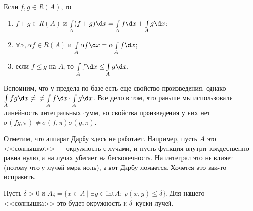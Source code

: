 \begin{Consequence}
Если $f, g \in R(A)$, то
\begin{enumerate}
\item $f + g \in R(A)$ и $\int\limits_A(f + g)\d x = \int\limits_A f \d x + \int\limits_Ag \d x$;
\item $\forall \alpha, \alpha f \in R(A)$ и $\int\limits_A\alpha f \d x = \alpha \int\limits_A f \d x$;
\item если $f \leq g$ на $A$, то $\int\limits_A f \d x \leq \int\limits_A g \d x$.
\end{enumerate}
\end{Consequence}

Вспомним, что у предела по базе есть еще свойство произведения, однако $\int\limits_A fg \d x \neq\\\neq \int\limits_A f\d x \cdot \int\limits_A g \d x$. Все дело в том, что раньше мы использовали линейность интегральных сумм, но свойства произведения у них нет: $\sigma(fg, \pi) \neq \sigma(f, \pi)\sigma(g, \pi)$.

Отметим, что аппарат Дарбу здесь не работает. Например, пусть $A$ это <<солнышко>> --- окружность с лучами, и пусть функция внутри тождественно равна нулю, а на лучах убегает на бесконечность. На интеграл это не влияет (потому что у лучей мера ноль), а вот Дарбу ломается. Хочется это как-то исправить.

Пусть $\delta > 0$ и $A_\delta = \{ x \in A \mid \exists y \in \mathrm{int}A:\ \rho(x, y) \leq \delta \}$. Для нашего <<солнышка>> это будет окружность и $\delta$--куски лучей.

